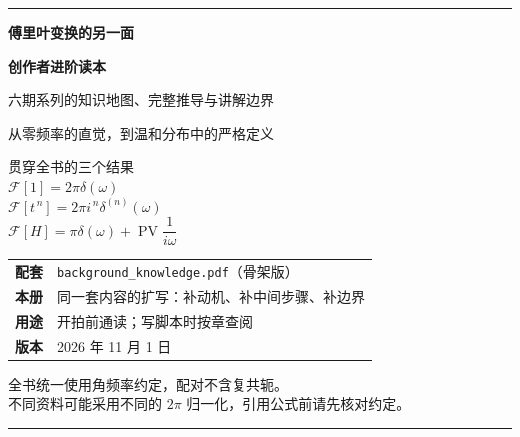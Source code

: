 \documentclass[11pt,fontset=none,a4paper,oneside]{ctexbook}
\theoremstyle{definition}
\theoremstyle{plain}
\theoremstyle{remark}
\numberwithin{equation}{chapter}
\newcommand{\F}{\mathcal{F}}
\newcommand{\PV}{\operatorname{PV}}
\begin{document}
\begin{titlepage}
\thispagestyle{empty}
\centering
\vspace*{2.2cm}

{\color{rulegray}\rule{\textwidth}{0.6pt}}

\vspace{1.4cm}

{\Huge\bfseries\color{mainblue} 傅里叶变换的另一面}

\vspace{0.5cm}

{\LARGE\bfseries\color{mainblue} 创作者进阶读本}

\vspace{1.0cm}

{\large 六期系列的知识地图、完整推导与讲解边界}

\vspace{0.4cm}

{\large 从零频率的直觉，到温和分布中的严格定义}

\vspace{1.2cm}

\begin{tcolorbox}[colback=softblue,colframe=mainblue!40,boxrule=0pt,arc=2pt,width=0.86\textwidth]
\centering
\vspace{0.2em}
{\large 贯穿全书的三个结果}\\[0.9em]
$\F[1]=2\pi\delta(\omega)$\\[0.45em]
$\F[t^{\,n}]=2\pi i^{\,n}\delta^{(n)}(\omega)$\\[0.45em]
$\F[H]=\pi\delta(\omega)+\PV\dfrac{1}{i\omega}$
\vspace{0.2em}
\end{tcolorbox}

\vspace{1.0cm}

{\normalsize
\begin{tabular}{rl}
\textbf{配套} & \texttt{background\_knowledge.pdf}（骨架版）\\[0.3em]
\textbf{本册} & 同一套内容的扩写：补动机、补中间步骤、补边界\\[0.3em]
\textbf{用途} & 开拍前通读；写脚本时按章查阅\\[0.3em]
\textbf{版本} & 2026 年 11 月 1 日\\
\end{tabular}}

\vfill

{\small\color{notegray}
全书统一使用角频率约定，配对不含复共轭。\\
不同资料可能采用不同的 $2\pi$ 归一化，引用公式前请先核对约定。}

\vspace{0.8cm}
{\color{rulegray}\rule{\textwidth}{0.6pt}}
\end{titlepage}
\end{document}
